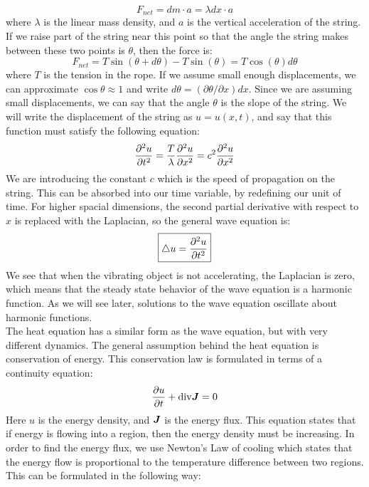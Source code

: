 \documentclass{article}
\begin{document}
\begin{equation}
    F_{net}=dm\cdot a=\lambda dx \cdot a
\end{equation}
where $\lambda$ is the linear mass density, and $a$ is the vertical acceleration of the string. If we raise part of the string near this point so that the angle the string makes between these two points is $\theta$, then the force is:
\begin{equation}
    F_{net}=T \sin(\theta + d\theta)-T \sin(\theta)=T\cos(\theta)d\theta
\end{equation}
where $T$ is the tension in the rope. If we assume small enough displacements, we can approximate $\cos\theta\approx 1$ and write $d\theta= (\partial\theta/\partial x) dx$. Since we are assuming small displacements, we can say that the angle $\theta$ is the slope of the string. We will write the displacement of the string as $u=u(x,t)$, and say that this function must satisfy the following equation:
\begin{equation}\frac{\partial ^2 u}{\partial t^2}= \frac{T}{\lambda}\frac{\partial ^2 u}{\partial x^2}=c^2 \frac{\partial ^2 u}{\partial x^2}\end{equation}
We are introducing the constant $c$ which is the speed of propagation on the string. This can be absorbed into our time variable, by redefining our unit of time. For higher spacial dimensions, the second partial derivative with respect to $x$ is replaced with the Laplacian, so the general wave equation is:
\begin{equation}
  \boxed{
    \bigtriangleup u =\frac{\partial ^2 u}{\partial t^2}
  }
\end{equation}
We see that when the vibrating object is not accelerating, the Laplacian is zero, which means that the steady state behavior of the wave equation is a harmonic function. As we will see later, solutions to the wave equation oscillate about harmonic functions.\\
The heat equation has a similar form as the wave equation, but with very different dynamics. The general assumption behind the heat equation is conservation of energy. This conservation law is formulated in terms of a continuity equation:
\begin{equation}
  \frac{\partial u}{\partial t}+\mathrm{div} \bm{J}=0
\end{equation}
Here $u$ is the energy density, and $\bm{J}$ is the energy flux. This equation states that if energy is flowing into a region, then the energy density must be increasing. In order to find the energy flux, we use Newton's Law of cooling which states that the energy flow is proportional to the temperature difference between two regions. This can be formulated in the following way:
\end{document}
